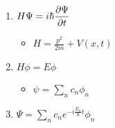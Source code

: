 

\vspace*{\fill}
\centering

\begin{enumerate}
    \item $\displaystyle H\Psi = i\hbar \pdv{\Psi}{t}$
        \begin{itemize}
            \item $\displaystyle H = \frac{p^2}{2m} + V(x,t)$ 
        \end{itemize}
    \item $\displaystyle H\phi = E\phi$
        \begin{itemize}
            \item $\psi = \sum_{n} c_{n} \phi_{n}$
        \end{itemize}
    \item $\displaystyle \Psi = \sum_{n} c_{n} e^{-i\frac{E_{n}}{\hbar}t} \phi_{n}$
\end{enumerate}

\centering
\vspace*{\fill}

